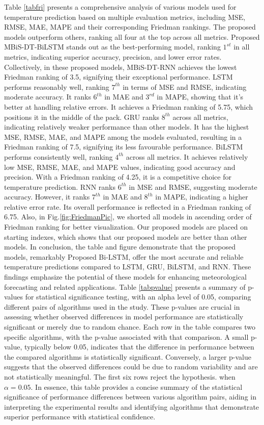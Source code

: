 Table \ref{tabfri} presents a comprehensive analysis of various models used for temperature prediction based on multiple evaluation metrics, including MSE, RMSE, MAE, MAPE and their corresponding Friedman rankings. The proposed models outperform others, ranking all four at the top across all metrics. Proposed MBiS-DT-BiLSTM stands out as the best-performing model, ranking $ 1^{st}$ in all metrics, indicating superior accuracy, precision, and lower error rates. Collectively, in these proposed models, MBiS-DT-RNN achieves the lowest Friedman ranking of 3.5, signifying their exceptional performance. LSTM performs reasonably well, ranking $7^{th}$ in terms of MSE and RMSE, indicating moderate accuracy. It ranks $6^{th}$ in MAE and $3^{rd}$ in MAPE, showing that it's better at handling relative errors. It achieves a Friedman ranking of 5.75, which positions it in the middle of the pack. GRU ranks $8^{th}$ across all metrics, indicating relatively weaker performance than other models. It has the highest MSE, RMSE, MAE, and MAPE among the models evaluated, resulting in a Friedman ranking of 7.5, signifying its less favourable performance. BiLSTM performs consistently well, ranking $4^{th}$ across all metrics. It achieves relatively low MSE, RMSE, MAE, and MAPE values, indicating good accuracy and precision. With a Friedman ranking of 4.25, it is a competitive choice for temperature prediction. RNN ranks $6^{th}$ in MSE and RMSE, suggesting moderate accuracy. However, it ranks $7^{th}$ in MAE and $8^{th}$ in MAPE, indicating a higher relative error rate. Its overall performance is reflected in a Friedman ranking of 6.75. Also, in Fig.\ref{fig:FriedmanPic}, we shorted all models in ascending order of Friedman ranking for better visualization. Our proposed models are placed on starting indexes, which shows that our proposed models are better than other models. In conclusion, the table and figure demonstrate that the proposed models, remarkably Proposed Bi-LSTM, offer the most accurate and reliable temperature predictions compared to LSTM, GRU, BiLSTM, and RNN. These findings emphasize the potential of these models for enhancing meteorological forecasting and related applications. Table \ref{tabpvalue} presents a summary of p-values for statistical significance testing, with an alpha level of 0.05, comparing different pairs of algorithms used in the study. These p-values are crucial in assessing whether observed differences in model performance are statistically significant or merely due to random chance. Each row in the table compares two specific algorithms, with the p-value associated with that comparison. A small p-value, typically below 0.05, indicates that the difference in performance between the compared algorithms is statistically significant. Conversely, a larger p-value suggests that the observed differences could be due to random variability and are not statistically meaningful.
The first six rows reject the hypothesis. when $\alpha=0.05$. In essence, this table provides a concise summary of the statistical significance of performance differences between various algorithm pairs, aiding in interpreting the experimental results and identifying algorithms that demonstrate superior performance with statistical confidence.




